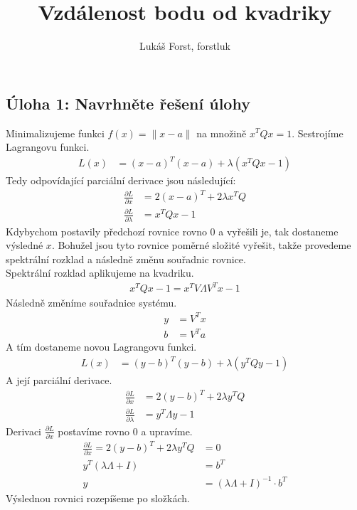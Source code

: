 \documentclass[12pt]{article}
\begin{document}
\title{Vzdálenost bodu od kvadriky}
\author{Lukáš Forst, forstluk}
\maketitle
	\subsection*{Úloha 1: Navrhněte řešení úlohy}
	Minimalizujeme funkci $f(x) = \|x-a\|$ na množině $x^{T}Qx = 1$. Sestrojíme
	Lagrangovu funkci.
	\begin{align*}
		L(x) &= (x-a)^{T}(x-a) + \lambda(x^{T}Qx - 1)
	\end{align*}
	Tedy odpovídající parciální derivace jsou následující:
	\begin{align*}
		\frac{\partial L}{\partial x} &= 2(x-a)^T + 2\lambda x^{T}Q \\
		\frac{\partial L}{\partial \lambda} &= x^TQx - 1
	\end{align*}
	Kdybychom postavily předchozí rovnice rovno $0$ a vyřešili je, tak dostaneme výsledné $x$. Bohužel jsou tyto rovnice poměrné složité vyřešit, takže provedeme spektrální rozklad a následně změnu souřadnic rovnice. \\
	Spektrální rozklad aplikujeme na kvadriku.
	\begin{align*}
		x^TQx - 1 = x^TV\Lambda V^Tx - 1
	\end{align*}
	Následně změníme souřadnice systému.
	\begin{align*}
		y &= V^Tx \\
		b &= V^Ta
	\end{align*}
	A tím dostaneme novou Lagrangovu funkci.
	\begin{align*}
		L(x) &= (y-b)^{T}(y-b) + \lambda(y^{T}Qy - 1)
	\end{align*}
	A její parciální derivace.
	\begin{align*}
		\frac{\partial L}{\partial x} &= 2(y-b)^T + 2\lambda y^{T}Q \\
		\frac{\partial L}{\partial \lambda} &= y^{T}\Lambda y - 1
	\end{align*}
	Derivaci $\frac{\partial L}{\partial x}$ postavíme rovno $0$ a upravíme.
	\begin{align*}
		\frac{\partial L}{\partial x} = 2(y-b)^T + 2\lambda y^{T}Q &= 0\\
		y^T(\lambda\Lambda + I) &= b^T \\
		y &= (\lambda\Lambda + I)^{-1} \cdot b^{T}
	\end{align*}
	Výslednou rovnici rozepíšeme po složkách.
\end{document}
